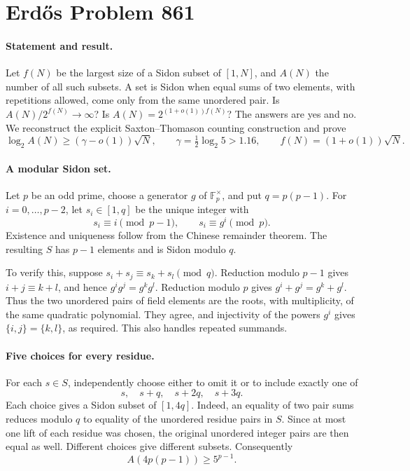 \section*{Erd\H{o}s Problem 861}

\paragraph{Statement and result.}
Let \(f(N)\) be the largest size of a Sidon subset of \([1,N]\), and \(A(N)\) the number of all such subsets. A set is Sidon when equal sums of two elements, with repetitions allowed, come only from the same unordered pair. Is \(A(N)/2^{f(N)}\to\infty\)? Is \(A(N)=2^{(1+o(1))f(N)}\)? The answers are yes and no. We reconstruct the explicit Saxton--Thomason counting construction and prove
\[
 \log_2 A(N)\geq(\gamma-o(1))\sqrt N,
 \qquad \gamma=\tfrac12\log_2 5>1.16,
 \qquad f(N)=(1+o(1))\sqrt N.
\tag{1}
\]

\paragraph{A modular Sidon set.}
Let \(p\) be an odd prime, choose a generator \(g\) of \(\mathbb F_p^\times\), and put \(q=p(p-1)\). For \(i=0,\ldots,p-2\), let \(s_i\in[1,q]\) be the unique integer with
\[
 s_i\equiv i\pmod{p-1},\qquad s_i\equiv g^i\pmod p.
\]
Existence and uniqueness follow from the Chinese remainder theorem. The resulting \(S\) has \(p-1\) elements and is Sidon modulo \(q\).

To verify this, suppose \(s_i+s_j\equiv s_k+s_l\pmod q\). Reduction modulo \(p-1\) gives \(i+j\equiv k+l\), and hence \(g^ig^j=g^kg^l\). Reduction modulo \(p\) gives \(g^i+g^j=g^k+g^l\). Thus the two unordered pairs of field elements are the roots, with multiplicity, of the same quadratic polynomial. They agree, and injectivity of the powers \(g^i\) gives \(\{i,j\}=\{k,l\}\), as required. This also handles repeated summands.

\paragraph{Five choices for every residue.}
For each \(s\in S\), independently choose either to omit it or to include exactly one of
\[
 s,\quad s+q,\quad s+2q,\quad s+3q.
\]
Each choice gives a Sidon subset of \([1,4q]\). Indeed, an equality of two pair sums reduces modulo \(q\) to equality of the unordered residue pairs in \(S\). Since at most one lift of each residue was chosen, the original unordered integer pairs are then equal as well. Different choices give different subsets. Consequently
\[
 A(4p(p-1))\geq5^{p-1}.
\tag{2}
\]


